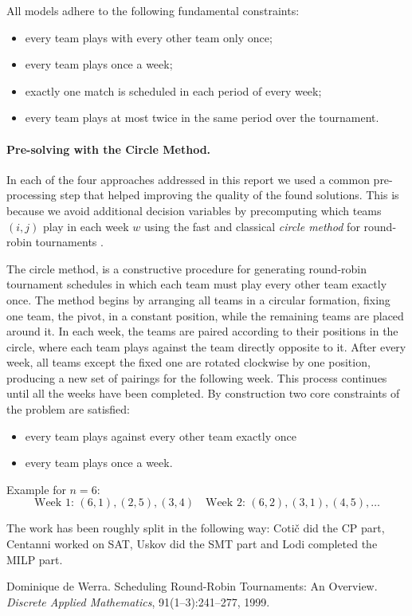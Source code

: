 \documentclass{article}
\begin{document}
All models adhere to the following fundamental constraints:
\begin{itemize}
\item every team plays with every other team only once;
\item every team plays once a week;
\item exactly one match is scheduled in each period of every week;
\item every team plays at most twice in the same period over the tournament.
\end{itemize}

\paragraph{Pre-solving with the Circle Method.}

In each of the four approaches addressed in this report we used a common pre-processing step that helped improving the quality of the found solutions. This is because we avoid additional decision variables by precomputing which teams $(i, j)$ play in each week $w$ using the fast and classical \emph{circle method} for round-robin tournaments \cite{dewerra1999}.

The circle method, is a constructive procedure for generating round-robin tournament schedules in which each team must play every other team exactly once. The method begins by arranging all teams in a circular formation, fixing one team, the pivot, in a constant position, while the remaining teams are placed around it. In each week, the teams are paired according to their positions in the circle, where each team plays against the team directly opposite to it. After every week, all teams except the fixed one are rotated clockwise by one position, producing a new set of pairings for the following week. This process continues until all the weeks have been completed. By construction two core constraints of the problem are satisfied:
\begin{itemize}
    \item every team plays against every other team exactly once
    \item every team plays once a week.
\end{itemize}

Example for $n = 6$:
\[
\text{Week 1: } (6,1), (2,5), (3,4) \quad \text{Week 2: } (6,2), (3,1), (4,5), \dots
\]

The work has been roughly split in the following way: Cotič did the CP part, Centanni worked on SAT, Uskov did the SMT part and Lodi completed the MILP part.


\begin{thebibliography}{9}

Dominique de Werra.
\newblock Scheduling Round-Robin Tournaments: An Overview.
\newblock \emph{Discrete Applied Mathematics}, 91(1–3):241--277, 1999.
\end{thebibliography}
\end{document}
